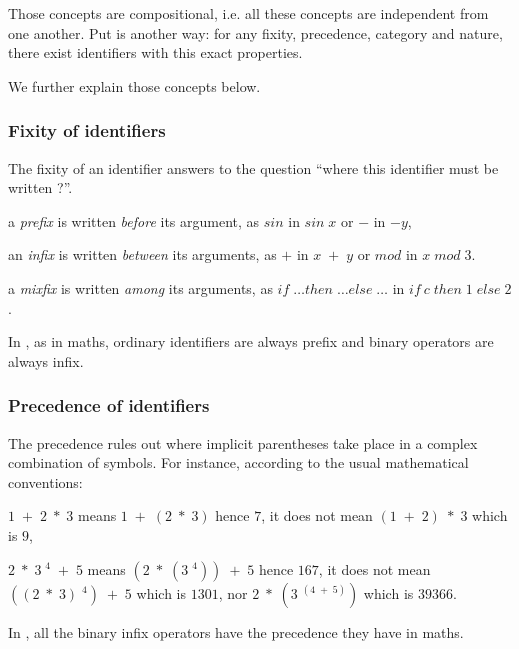 Those concepts are compositional, i.e. all these concepts are independent
from one another. Put is another way: for any fixity, precedence, category and nature,
there exist identifiers with this exact properties.

We further explain those concepts below.

\subsubsection{Fixity of identifiers}

The fixity of an identifier answers to the question ``where this identifier
must be written ?''.

\begin{citemize}
\item a {\em prefix} is written {\em before} its argument, as $sin$ in
 $sin\; x$ or $-$ in $- y$,
\item an {\em infix} is written {\em between} its arguments, as $+$ in
 $x\; +\; y$ or $mod$ in $x\; mod \;3$.
\item a {\em mixfix} is written {\em among} its arguments, as
  $if\; \ldots then\; \ldots else\; \ldots$ in
  $if\ c\; then\; 1\; else\; 2 $.
\end{citemize}

In {\focal}, as in maths, ordinary identifiers are always prefix and binary operators are
always infix.

\subsubsection{Precedence of identifiers}

The precedence rules out where implicit parentheses take place in a
complex combination of symbols. For instance, according to the usual mathematical
conventions:
\begin{citemize}
\item $1\; +\; 2\; *\; 3$  means $1\; +\; (2\; *\; 3)$ hence $7$,
      it does not mean $(1\; +\; 2)\; *\; 3$ which is $9$,
\item $2\; *\; 3\; ^4\; +\; 5$ means
      $(2\; *\; (3\; ^4))\; +\; 5$ hence $167$, it does not mean
      $((2\; *\; 3)\; ^4)\; +\; 5$ which is $1301$,
      nor $2\; *\; (3\; ^{(4\; +\; 5)})$ which is $39366$.
\end{citemize}

In {\focal}, all the binary infix operators have the precedence they have in maths.

